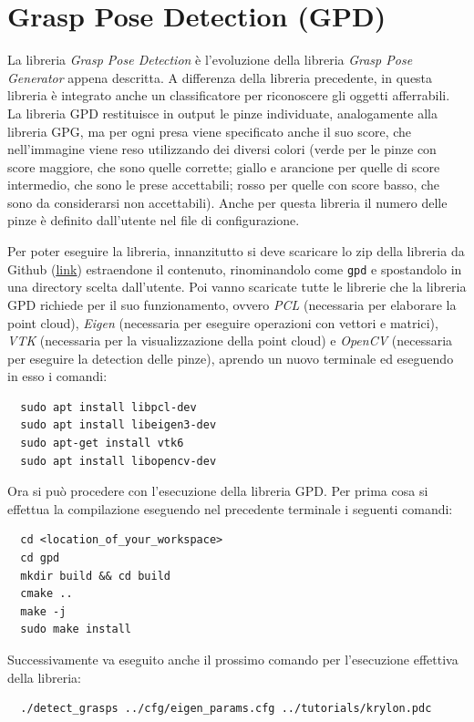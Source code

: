 \documentclass{report}
\begin{document}
\section{Grasp Pose Detection (GPD)}\label{GPD}
La libreria \textit{Grasp Pose Detection} è l'evoluzione della libreria \textit{Grasp Pose Generator} appena descritta. A differenza della libreria precedente, in questa libreria è integrato anche un classificatore per riconoscere gli oggetti afferrabili. La libreria GPD restituisce in output le pinze individuate, analogamente alla libreria GPG, ma per ogni presa viene specificato anche il suo score, che nell'immagine viene reso utilizzando dei diversi colori (verde per le pinze con score maggiore, che sono quelle corrette; giallo e arancione per quelle di score intermedio, che sono le prese accettabili; rosso per quelle con score basso, che sono da considerarsi non accettabili). Anche per questa libreria il numero delle pinze è definito dall'utente nel file di configurazione. \par
Per poter eseguire la libreria, innanzitutto si deve scaricare lo zip della libreria da Github (\textcolor{blue}{\underline{\href{https://github.com/atenpas/gpd}{link}}}) estraendone il contenuto, rinominandolo come \texttt{gpd} e spostandolo in una directory scelta dall'utente. Poi vanno scaricate tutte le librerie che la libreria GPD richiede per il suo funzionamento, ovvero \textit{PCL} (necessaria per elaborare la point cloud), \textit{Eigen} (necessaria per eseguire operazioni con vettori e matrici), \textit{VTK} (necessaria per la visualizzazione della point cloud) e \textit{OpenCV} (necessaria per eseguire la detection delle pinze), aprendo un nuovo terminale ed eseguendo in esso i comandi:
\begin{verbatim}
  sudo apt install libpcl-dev
  sudo apt install libeigen3-dev
  sudo apt-get install vtk6
  sudo apt install libopencv-dev
\end{verbatim}
Ora si può procedere con l'esecuzione della libreria GPD. Per prima cosa si effettua la compilazione eseguendo nel precedente terminale i seguenti comandi:
\begin{verbatim}
  cd <location_of_your_workspace> 
  cd gpd
  mkdir build && cd build
  cmake ..
  make -j
  sudo make install
\end{verbatim}
Successivamente va eseguito anche il prossimo comando per l'esecuzione effettiva della libreria:
\begin{verbatim}
  ./detect_grasps ../cfg/eigen_params.cfg ../tutorials/krylon.pdc
\end{verbatim}
\end{document}
